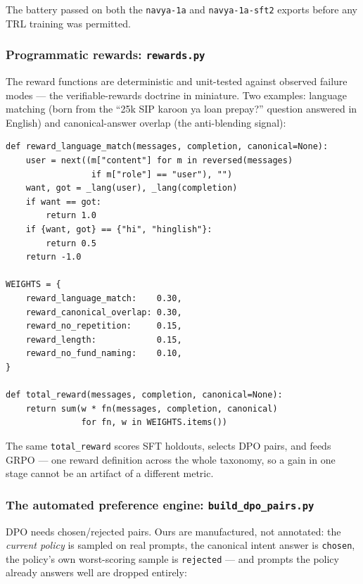 The battery passed on both the \texttt{navya-1a} and
\texttt{navya-1a-sft2} exports before any TRL training was permitted.

\subsubsection{Programmatic rewards: \texttt{rewards.py}}

The reward functions are deterministic and unit-tested against observed
failure modes --- the verifiable-rewards doctrine in miniature. Two
examples: language matching (born from the ``25k SIP karoon ya
loan prepay?'' question answered in English) and canonical-answer overlap
(the anti-blending signal):

\begin{lstlisting}[style=shadedpython,basicstyle=\scriptsize\ttfamily]
def reward_language_match(messages, completion, canonical=None):
    user = next((m["content"] for m in reversed(messages)
                 if m["role"] == "user"), "")
    want, got = _lang(user), _lang(completion)
    if want == got:
        return 1.0
    if {want, got} == {"hi", "hinglish"}:
        return 0.5
    return -1.0

WEIGHTS = {
    reward_language_match:    0.30,
    reward_canonical_overlap: 0.30,
    reward_no_repetition:     0.15,
    reward_length:            0.15,
    reward_no_fund_naming:    0.10,
}

def total_reward(messages, completion, canonical=None):
    return sum(w * fn(messages, completion, canonical)
               for fn, w in WEIGHTS.items())
\end{lstlisting}

The same \texttt{total\_reward} scores SFT holdouts, selects DPO pairs,
and feeds GRPO --- one reward definition across the whole taxonomy, so a
gain in one stage cannot be an artifact of a different metric.

\subsubsection{The automated preference engine: \texttt{build\_dpo\_pairs.py}}

DPO needs chosen/rejected pairs. Ours are manufactured, not annotated: the
\emph{current policy} is sampled on real prompts, the canonical intent
answer is \texttt{chosen}, the policy's own worst-scoring sample is
\texttt{rejected} --- and prompts the policy already answers well are
dropped entirely:

